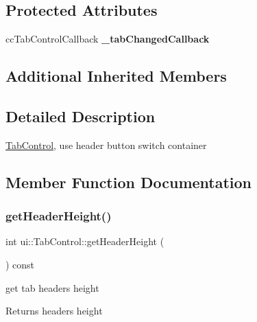 \subsection*{Protected Attributes}
\begin{DoxyCompactItemize}
\item 
\mbox{\label{classui_1_1TabControl_ac1df4a4c88e90795c33f6bad4d4c381a}} 
cc\+Tab\+Control\+Callback {\bfseries \+\_\+tab\+Changed\+Callback}
\end{DoxyCompactItemize}
\subsection*{Additional Inherited Members}


\subsection{Detailed Description}
\hyperlink{classui_1_1TabControl}{Tab\+Control}, use header button switch container 

\subsection{Member Function Documentation}
\mbox{\label{classui_1_1TabControl_a289b60ebd1c8230753132f7bce2c94aa}} 
\subsubsection{\texorpdfstring{get\+Header\+Height()}{getHeaderHeight()}\hspace{0.1cm}{\footnotesize\ttfamily [1/2]}}
{\footnotesize\ttfamily int ui\+::\+Tab\+Control\+::get\+Header\+Height (\begin{DoxyParamCaption}{ }\end{DoxyParamCaption}) const\hspace{0.3cm}{\ttfamily [inline]}}

get tab header\textquotesingle{}s height \begin{DoxyReturn}{Returns}
header\textquotesingle{}s height 
\end{DoxyReturn}
\mbox{\label{classui_1_1TabControl_a289b60ebd1c8230753132f7bce2c94aa}} 
